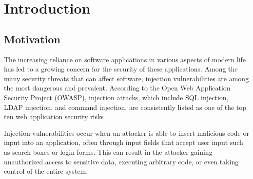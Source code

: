 \chapter{Introduction}
\label{chapter:introduction}

\begin{comment}
	Your introduction goes here
	\begin{itemize}
		\item Generic description of the broad field of research
		\item Current state of research
		\item What's the gap that you're trying to fill?
		\item Short motivation
		\item Summary of the most important results
		\item Your contribution
		\item Structure of the thesis
	\end{itemize}
	
	1-2.5 pages
	
	This text is not too detailed. Start quite high-level, then narrow down until
	you reach your topic. After the introduction, the reader must want to read the
	rest of your thesis and understand the relevance. However, it doesn't have to
	be super technical.
\end{comment}

\section{Motivation}

The increasing reliance on software applications in various aspects of modern life has led to a growing concern for the security of these applications. Among the many security threats that can affect software, injection vulnerabilities are among the most dangerous and prevalent. According to the Open Web Application Security Project (OWASP), injection attacks, which include SQL injection, LDAP injection, and command injection, are consistently listed as one of the top ten web application security risks \cite{owasp}.

Injection vulnerabilities occur when an attacker is able to insert malicious code or input into an application, often through input fields that accept user input such as search boxes or login forms. This can result in the attacker gaining unauthorized access to sensitive data, executing arbitrary code, or even taking control of the entire system.

